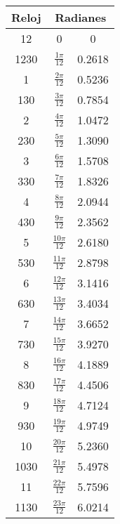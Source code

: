 \documentclass{book}
\begin{document}
		\begin{table}[h]
			\centering
			{\renewcommand{\arraystretch}{1.5}	
				\begin{tabular}{|c||c|c|}
					\hline 
                    \multicolumn{1}{|c||}{Reloj} &
					\multicolumn{2}{c|}{Radianes} \\    
					\hline	
					12 & 0 & 0 \\ \hline
					1230 & $\frac{1\pi}{12}$ & 0.2618 \\ \hline
					1 & $\frac{2\pi}{12}$ & 0.5236 \\ \hline 
					130 & $\frac{3\pi}{12}$ & 0.7854 \\ \hline
					2 & $\frac{4\pi}{12}$ & 1.0472 \\ \hline
					230 & $\frac{5\pi}{12}$ & 1.3090 \\ \hline
					3 & $\frac{6\pi}{12}$ & 1.5708 \\ \hline
					330 & $\frac{7\pi}{12}$ & 1.8326 \\ \hline
					4 & $\frac{8\pi}{12}$ & 2.0944 \\ \hline
					430 & $\frac{9\pi}{12}$ & 2.3562 \\ \hline
					5 & $\frac{10\pi}{12}$ & 2.6180 \\ \hline
					530 & $\frac{11\pi}{12}$ & 2.8798 \\ \hline
					6 & $\frac{12\pi}{12}$ & 3.1416 \\ \hline
					630 & $\frac{13\pi}{12}$ & 3.4034 \\ \hline
					7 & $\frac{14\pi}{12}$ & 3.6652 \\ \hline
					730 & $\frac{15\pi}{12}$ & 3.9270 \\ \hline
					8 & $\frac{16\pi}{12}$ & 4.1889 \\ \hline
					830 & $\frac{17\pi}{12}$ & 4.4506 \\ \hline
					9 & $\frac{18\pi}{12}$ & 4.7124 \\ \hline
					930 & $\frac{19\pi}{12}$ & 4.9749 \\ \hline
					10 & $\frac{20\pi}{12}$ & 5.2360 \\ \hline
					1030 & $\frac{21\pi}{12}$ & 5.4978 \\ \hline
					11 & $\frac{22\pi}{12}$ & 5.7596 \\ \hline
					1130 & $\frac{23\pi}{12}$ & 6.0214 \\ \hline
				\end{tabular}
			}\quad
		\end{table}		
		
		
		
	
		
		
		
		
\end{document}
